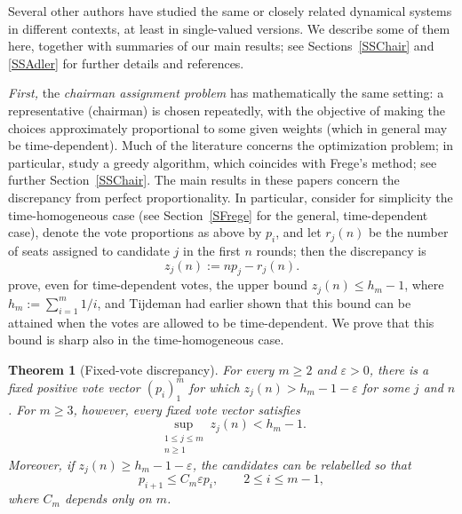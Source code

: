 \documentclass[11pt,reqno,tbtags,a4paper]{amsart}
\numberwithin{equation}{section}
\renewcommand\le{\leq}
\renewcommand\ge{\geq}
\renewcommand\leq{\leqslant}
\renewcommand\geq{\geqslant}
\theoremstyle{plain}%
\newtheorem{fregeintrotheorem}{Theorem}
\theoremstyle{definition}
\theoremstyle{remark}
\newcommand{\refS}[1]{Section~\ref{#1}}
\newcommand{\refSs}[1]{Sections~\ref{#1}}
\newcommand{\refSS}[1]{Section~\ref{#1}}
\newcommand\xfrac[2]{#1/#2}
\newcommand\0{{\boldsymbol 0}}
\newcommand\1{{\boldsymbol 1}}
\begin{document}
Several other authors have studied the same or closely related dynamical
systems in different contexts, at least in single-valued versions.
We describe some of them here, together with summaries of our main results;
see \refSs{SSChair} and \ref{SSAdler} for further details and references.

\medskip
\emph{First,} 
the \emph{chairman assignment problem} 
\cite{Meijer73,Tijdeman80,Coppersmith}
has mathematically the same setting: a representative (chairman)
is chosen repeatedly, with the objective of making the choices 
approximately proportional to some given weights
(which in general may be time-dependent).
Much of the literature concerns the optimization problem;
in particular,
\citet{Coppersmith} study a greedy
algorithm, which coincides with  Frege's method;
see further \refSS{SSChair}.
The main results in these papers concern the discrepancy from perfect
proportionality. In particular, consider for simplicity the time-homogeneous
case (see \refS{SFrege} for the general, time-dependent case), denote the
vote proportions as above by $p_i$, and
let $r_j(n)$ be the number of seats assigned to candidate $j$ in the first
$n$ rounds; then the discrepancy is
\begin{equation}
 z_j(n):=np_j-r_j(n).
\end{equation}
\citet{Coppersmith} prove, even for time-dependent votes, the
upper bound $z_j(n)\le h_m-1$, where 
$h_m:=\sum_{i=1}^m\xfrac1i$,
and Tijdeman \cite{Tijdeman80} had earlier shown
that this bound can be attained when the votes are allowed to be
time-dependent. We prove that this bound is sharp also
in the time-homogeneous case.

\begin{fregeintrotheorem}[Fixed-vote discrepancy]\label{TIntroA}
For every $m\ge2$ and $\varepsilon>0$, there is a fixed positive vote
vector $(p_i)_1^m$ for which $z_j(n)>h_m-1-\varepsilon$ for some $j$ and $n$.
For $m\ge3$, however, every fixed vote vector satisfies
\begin{equation}\label{tia1}
 \sup_{\substack{1\le j\le m\\ n\ge1}}z_j(n)<h_m-1.
\end{equation}
Moreover, if $z_j(n)\ge h_m-1-\varepsilon$, the candidates can be
relabelled so that
\begin{equation}\label{tia2}
 p_{i+1}\le C_m\varepsilon p_i,\qquad 2\le i\le m-1,
\end{equation}
where $C_m$ depends only on $m$.
\end{fregeintrotheorem}
\end{document}
